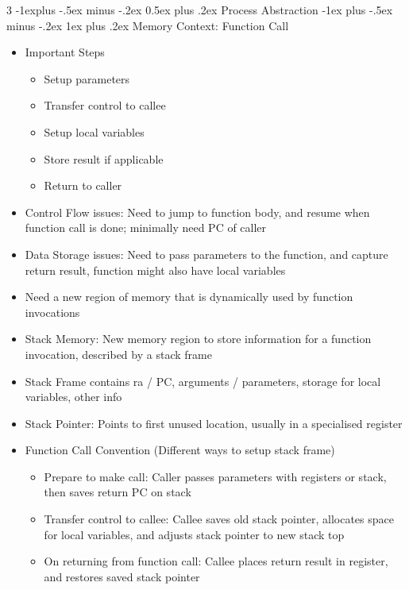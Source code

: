 \documentclass[10pt, landscape]{article}
\makeatletter
\renewcommand{\section}{\@startsection{section}{1}{0mm}%
                                {-1ex plus -.5ex minus -.2ex}%
                                {0.5ex plus .2ex}%
                                {\normalfont\large\bfseries}}
\renewcommand{\section}{\@startsection{section}{2}{0mm}%
                                {-1explus -.5ex minus -.2ex}%
                                {0.5ex plus .2ex}%
                                {\normalfont\normalsize\bfseries}}
\renewcommand{\subsection}{\@startsection{subsection}{3}{0mm}%
                                {-1ex plus -.5ex minus -.2ex}%
                                {1ex plus .2ex}%
                                {\normalfont\small\bfseries}}%
\makeatother
\begin{document}
\begin{multicols*}{3}
\section{Process Abstraction}
\subsection{Memory Context: Function Call}
\begin{itemize}
    \item Important Steps
    \begin{itemize}
        \item Setup parameters
        \item Transfer control to callee
        \item Setup local variables
        \item Store result if applicable
        \item Return to caller
    \end{itemize}
    \item Control Flow issues: Need to jump to function body, and resume when function call is done; minimally need PC of caller
    \item Data Storage issues: Need to pass parameters to the function, and capture return result, function might also have local variables
    \item Need a new region of memory that is dynamically used by function invocations
    \item Stack Memory: New memory region to store information for a function invocation, described by a stack frame
    \item Stack Frame contains ra / PC, arguments / parameters, storage for local variables, other info
    \item Stack Pointer: Points to first unused location, usually in a specialised register
    \item Function Call Convention (Different ways to setup stack frame)
    \begin{itemize}
        \item Prepare to make call: Caller passes parameters with registers or stack, then saves return PC on stack
        \item Transfer control to callee: Callee saves old stack pointer, allocates space for local variables, and adjusts stack pointer to new stack top
        \item On returning from function call: Callee places return result in register, and restores saved stack pointer

\end{itemize}
\end{itemize}
\end{multicols*}
\end{document}
